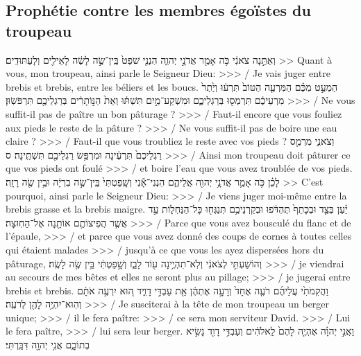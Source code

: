 \begin{paracol}[1]
  \subsection*{Prophétie contre les membres égoïstes du troupeau}
  \verset
  {וְאַתֵּ֣נָה צֹאנִ֔י כֹּ֥ה אָמַ֖ר אֲדֹנָ֣י יְהוִ֑ה
    הִנְנִ֤י שֹׁפֵט֙ בֵּֽין־שֶׂ֣ה לָשֶׂ֔ה לָאֵילִ֖ים וְלָעַתּוּדִֽים׃}
  {>> Quant à vous, mon troupeau, ainsi parle le Seigneur Dieu:
    >>> / Je vais juger entre brebis et brebis, entre les béliers et les boucs.}
  \verset
  {הַמְעַ֣ט מִכֶּ֗ם הַמִּרְעֶ֤ה הַטּוֹב֙ תִּרְע֔וּ
    וְיֶ֙תֶר֙ מִרְעֵיכֶ֔ם תִּרְמְס֖וּ בְּרַגְלֵיכֶ֑ם
    וּמִשְׁקַע־מַ֣יִם תִּשְׁתּ֔וּ
    וְאֵת֙ הַנּ֣וֹתָרִ֔ים בְּרַגְלֵיכֶ֖ם תִּרְפֹּשֽׂוּן׃}
  {>>> / Ne vous suffit-il pas de paître un bon pâturage ?
    >>> / Faut-il encore que vous fouliez aux pieds le reste de la pâture ?
    >>> / Ne vous suffit-il pas de boire une eau claire ?
    >>> / Faut-il que vous troubliez le reste avec vos pieds ?}
  \verset
  {וְצֹאנִ֑י מִרְמַ֤ס רַגְלֵיכֶם֙ תִּרְעֶ֔ינָה
    וּמִרְפַּ֥שׂ רַגְלֵיכֶ֖ם תִּשְׁתֶּֽינָה׃ ס}
  {>>> / Ainsi mon troupeau doit pâturer ce que vos pieds ont foulé
    >>> / et boire l’eau que vous avez troublée de vos pieds.}
  \verseSpace
  \verset
  {לָכֵ֗ן כֹּ֥ה אָמַ֛ר אֲדֹנָ֥י יְהוִ֖ה אֲלֵיהֶ֑ם
    הִנְנִי־אָ֕נִי וְשָֽׁפַטְתִּי֙ בֵּֽין־שֶׂ֣ה בִרְיָ֔ה וּבֵ֥ין שֶׂ֖ה רָזָֽה׃}
  {>> C’est pourquoi, ainsi parle le Seigneur Dieu:
    >>> / Je viens juger moi-même entre la brebis grasse et la brebis maigre.}
  \verset
  {יַ֗עַן בְּצַ֤ד וּבְכָתֵף֙ תֶּהְדֹּ֔פוּ
    וּבְקַרְנֵיכֶ֥ם תְּנַגְּח֖וּ כָּל־הַנַּחְל֑וֹת
    עַ֣ד אֲשֶׁ֧ר הֲפִיצוֹתֶ֛ם אוֹתָ֖נָה אֶל־הַחֽוּצָה׃}
  {>>> / Parce que vous avez bousculé du flanc et de l’épaule,
    >>> / et parce que vous avez donné des coups de cornes à toutes celles qui étaient malades
    >>> / jusqu’à ce que vous les ayez dispersées hors du pâturage,}
  \verset
  {וְהוֹשַׁעְתִּ֣י לְצֹאנִ֔י וְלֹֽא־תִהְיֶ֥ינָה ע֖וֹד לָבַ֑ז
    וְשָׁ֣פַטְתִּ֔י בֵּ֥ין שֶׂ֖ה לָשֶֽׂה׃}
  {>>> / je viendrai au secours de mes bêtes et elles ne seront plus au pillage;
    >>> / je jugerai entre brebis et brebis.}
  \verset
  {וַהֲקִמֹתִ֙י עֲלֵיהֶ֜ם רֹעֶ֤ה אֶחָד֙
    וְרָעָ֣ה אֶתְהֶ֔ן
    אֵ֖ת עַבְדִּ֣י דָוִ֑יד
    ה֚וּא יִרְעֶ֣ה אֹתָ֔ם
    וְהֽוּא־יִהְיֶ֥ה לָהֶ֖ן לְרֹעֶֽה׃}
  {>>> / Je susciterai à la tête de mon troupeau un berger unique;
    >>> / il le fera paître:
    >>> / ce sera mon serviteur David.
    >>> / Lui le fera paître,
    >>> / lui sera leur berger.}
  \verset
  {וַאֲנִ֣י יְהוָ֗ה אֶהְיֶ֤ה לָהֶם֙ לֵֽאלֹהִ֔ים
    וְעַבְדִּ֥י דָוִ֖ד נָשִׂ֣יא בְתוֹכָ֑ם
    אֲנִ֥י יְהוָ֖ה דִּבַּֽרְתִּי׃}

\end{paracol}
